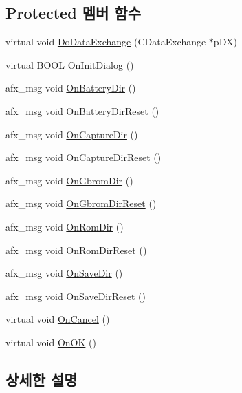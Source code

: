 \subsection*{Protected 멤버 함수}
\begin{DoxyCompactItemize}
\item 
virtual void \mbox{\hyperlink{class_directories_a1c9309bbbbd233e7d5916f868f1f2671}{Do\+Data\+Exchange}} (C\+Data\+Exchange $\ast$p\+DX)
\item 
virtual B\+O\+OL \mbox{\hyperlink{class_directories_a53964c598a5541b1d65cfee62e5d8587}{On\+Init\+Dialog}} ()
\item 
afx\+\_\+msg void \mbox{\hyperlink{class_directories_a31c9021298d9f3a3ea1beabe73ab7685}{On\+Battery\+Dir}} ()
\item 
afx\+\_\+msg void \mbox{\hyperlink{class_directories_a9479f79772b934344110acfccd64a064}{On\+Battery\+Dir\+Reset}} ()
\item 
afx\+\_\+msg void \mbox{\hyperlink{class_directories_a01d34b2ff1d1c0a2a3e638e0cfdd7db7}{On\+Capture\+Dir}} ()
\item 
afx\+\_\+msg void \mbox{\hyperlink{class_directories_a2e98e0696392fcd819f48ac56012c35d}{On\+Capture\+Dir\+Reset}} ()
\item 
afx\+\_\+msg void \mbox{\hyperlink{class_directories_acb13ecb0add4c5e10ed47d40d6a8605c}{On\+Gbrom\+Dir}} ()
\item 
afx\+\_\+msg void \mbox{\hyperlink{class_directories_aa323eb09c0caba8b8e5ff7984fd8e2e6}{On\+Gbrom\+Dir\+Reset}} ()
\item 
afx\+\_\+msg void \mbox{\hyperlink{class_directories_a0ed6f361bde84a4a6a37c41582a929ec}{On\+Rom\+Dir}} ()
\item 
afx\+\_\+msg void \mbox{\hyperlink{class_directories_a944a8a843ab8f0cdec54bf8aaba7d8a5}{On\+Rom\+Dir\+Reset}} ()
\item 
afx\+\_\+msg void \mbox{\hyperlink{class_directories_a0951489dd35ed7af5fb7ea27c95fbe8e}{On\+Save\+Dir}} ()
\item 
afx\+\_\+msg void \mbox{\hyperlink{class_directories_aeb85866cbd498c057e9bf66b58a78959}{On\+Save\+Dir\+Reset}} ()
\item 
virtual void \mbox{\hyperlink{class_directories_a139df4e3666356c21c7e5f02ae268193}{On\+Cancel}} ()
\item 
virtual void \mbox{\hyperlink{class_directories_aabe175a096e8718818d7bca6bd6cd455}{On\+OK}} ()
\end{DoxyCompactItemize}


\subsection{상세한 설명}


